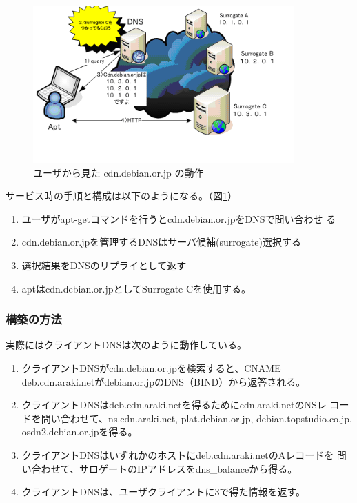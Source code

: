 \documentclass[mingoth,a4paper]{jsarticle}
\begin{document}
\begin{figure}[htbp]
 \begin{center}
  \includegraphics[width=100mm]{image200810/cdn-userviwer.png}
 \end{center}
 \caption{ユーザから見た cdn.debian.or.jp の動作}
 \label{fig:cdn-userviwer}
\end{figure}

サービス時の手順と構成は以下のようになる。（図\ref{fig:cdn-userviwer}）

\begin{enumerate}
 \item ユーザがapt-getコマンドを行うとcdn.debian.or.jpをDNSで問い合わせ
       る
 \item cdn.debian.or.jpを管理するDNSはサーバ候補(surrogate)選択する
 \item 選択結果をDNSのリプライとして返す
 \item aptはcdn.debian.or.jpとしてSurrogate Cを使用する。
\end{enumerate}

\subsubsection{構築の方法}

実際にはクライアントDNSは次のように動作している。

\begin{enumerate}
 \item クライアントDNSがcdn.debian.or.jpを検索すると、CNAME
       deb.cdn.araki.netがdebian.or.jpのDNS（BIND）から返答される。
 \item クライアントDNSはdeb.cdn.araki.netを得るためにcdn.araki.netのNSレ
       コードを問い合わせて、ns.cdn.araki.net, plat.debian.or.jp,
       debian.topstudio.co.jp, osdn2.debian.or.jpを得る。
 \item クライアントDNSはいずれかのホストにdeb.cdn.araki.netのAレコードを
       問い合わせて、サロゲートのIPアドレスをdns\_balanceから得る。
 \item クライアントDNSは、ユーザクライアントに3で得た情報を返す。
\end{enumerate}
\end{document}

